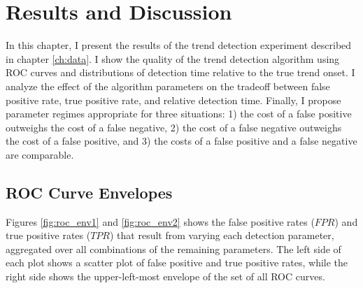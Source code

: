 \chapter{Results and Discussion}
\label{ch:results}

In this chapter, I present the results of the trend detection experiment
described in chapter \ref{ch:data}. I show the quality of the trend detection
algorithm using ROC curves and distributions of detection time relative to the
true trend onset. I analyze the effect of the algorithm parameters on the
tradeoff between false positive rate, true positive rate, and relative detection
time. Finally, I propose parameter regimes appropriate for three situations: 1)
the cost of a false positive outweighs the cost of a false negative, 2) the cost
of a false negative outweighs the cost of a false positive, and 3) the costs of
a false positive and a false negative are comparable.

\section{ROC Curve Envelopes}

Figures \ref{fig:roc_env1} and \ref{fig:roc_env2} shows the false positive
rates ($FPR$) and true positive rates ($TPR$) that result from varying each
detection parameter, aggregated over all combinations of the remaining
parameters. The left side of each plot shows a scatter plot of false positive
and true positive rates, while the right side shows the upper-left-most envelope
of the set of all ROC curves.

